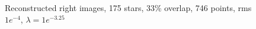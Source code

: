 \vspace{-0.2in}
\begin{figure}[h!]
\hspace{-0.5in}
\hspace{-1in}
\caption [Reconstructed right images, 175 stars, 33\% overlap, 746 points,  rms $1e^{-4}$, $\lambda = 1e^{-3.25}$]{Reconstructed right images, 175 stars, 33\% overlap, 746 points, rms $1e^{-4}$, $\lambda = 1e^{-3.25}$}
\label{fig:expt16}
\end{figure}
\vspace{-0.2in}
